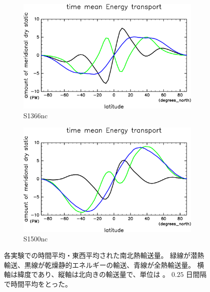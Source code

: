 \documentclass[body]{subfiles}
\begin{document}
\begin{figure}[t]
	\centering
	\begin{subfigure}{.4\textwidth}
		\centering
		\includegraphics[width=\textwidth]{S1366-nc/EngyFlx,time=3650:4015-crop-rotate.pdf}
		\caption{S1366nc}\label{EnFlxS1366nc}
	\end{subfigure}
	\begin{subfigure}{.4\textwidth}
		\centering
		\includegraphics[width=\textwidth]{S1500-nc/EngyFlx,time=3650:4015-crop-rotate.pdf}
		\caption{S1500nc}\label{EnFlxS1500nc}
	\end{subfigure}
	\caption[各実験での南北熱輸送量]{
		各実験での時間平均・東西平均された南北熱輸送量。
		緑線が潜熱輸送、黒線が乾燥静的エネルギーの輸送、青線が全熱輸送量。
		横軸は緯度であり、縦軸は北向きの輸送量で、単位は 。
		\(0.25\) 日間隔で時間平均をとった。
	}\label{EnFlxnc}
\end{figure}
\end{document}
